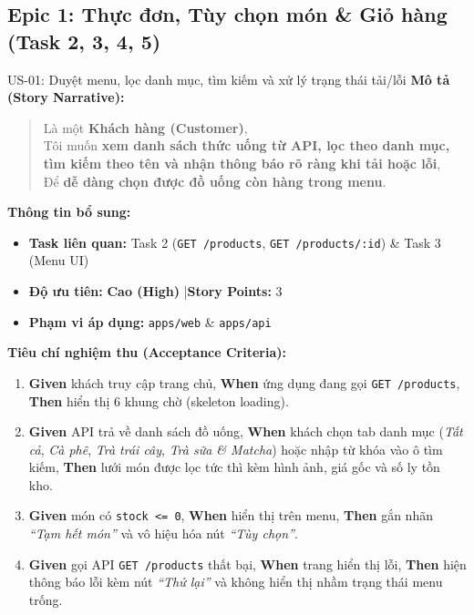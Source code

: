 \documentclass[12pt,a4paper]{article}
\begin{document}
\subsection{Epic 1: Thực đơn, Tùy chọn món \& Giỏ hàng (Task 2, 3, 4, 5)}

\begin{userstorybox}{US-01: Duyệt menu, lọc danh mục, tìm kiếm và xử lý trạng thái tải/lỗi}
    \textbf{Mô tả (Story Narrative):}
    \begin{quote}
        Là một \textbf{Khách hàng (Customer)},\\
        Tôi muốn \textbf{xem danh sách thức uống từ API, lọc theo danh mục, tìm kiếm theo tên và nhận thông báo rõ ràng khi tải hoặc lỗi},\\
        Để \textbf{dễ dàng chọn được đồ uống còn hàng trong menu}.
    \end{quote}

    \textbf{Thông tin bổ sung:}
    \begin{itemize}[noitemsep]
        \item \textbf{Task liên quan:} Task 2 (\texttt{GET /products}, \texttt{GET /products/:id}) \& Task 3 (Menu UI)
        \item \textbf{Độ ưu tiên:} \textcolor{taghigh}{\textbf{Cao (High)}} \quad|\quad \textbf{Story Points:} 3
        \item \textbf{Phạm vi áp dụng:} \texttt{apps/web} \& \texttt{apps/api}
    \end{itemize}

    \textbf{Tiêu chí nghiệm thu (Acceptance Criteria):}
    \begin{enumerate}[noitemsep]
        \item \textbf{Given} khách truy cập trang chủ, \textbf{When} ứng dụng đang gọi \texttt{GET /products}, \textbf{Then} hiển thị 6 khung chờ (skeleton loading).
        \item \textbf{Given} API trả về danh sách đồ uống, \textbf{When} khách chọn tab danh mục (\textit{Tất cả}, \textit{Cà phê}, \textit{Trà trái cây}, \textit{Trà sữa \& Matcha}) hoặc nhập từ khóa vào ô tìm kiếm, \textbf{Then} lưới món được lọc tức thì kèm hình ảnh, giá gốc và số ly tồn kho.
        \item \textbf{Given} món có \texttt{stock <= 0}, \textbf{When} hiển thị trên menu, \textbf{Then} gắn nhãn \textit{``Tạm hết món''} và vô hiệu hóa nút \textit{``Tùy chọn''}.
        \item \textbf{Given} gọi API \texttt{GET /products} thất bại, \textbf{When} trang hiển thị lỗi, \textbf{Then} hiện thông báo lỗi kèm nút \textit{``Thử lại''} và không hiển thị nhầm trạng thái menu trống.
    \end{enumerate}
\end{userstorybox}
\end{document}
